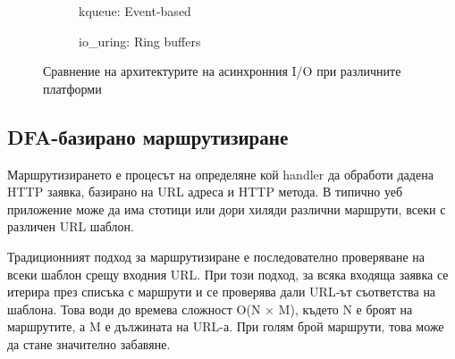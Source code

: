 \begin{figure}[H]
\begin{subfigure}[b]{0.32\textwidth}
\caption{kqueue: Event-based}
\label{fig:io-kqueue}
\end{subfigure}
\hfill
\begin{subfigure}[b]{0.32\textwidth}
\centering
{}
\caption{io\_uring: Ring buffers}
\label{fig:io-iouring}
\end{subfigure}
\caption{Сравнение на архитектурите на асинхронния I/O при различните платформи}
\label{fig:io-comparison}
\end{figure}

\subsection{DFA-базирано маршрутизиране}

Маршрутизирането е процесът на определяне кой handler да обработи дадена HTTP заявка, базирано на URL адреса и HTTP метода. В типично уеб приложение може да има стотици или дори хиляди различни маршрути, всеки с различен URL шаблон.

Традиционният подход за маршрутизиране е последователно проверяване на всеки шаблон срещу входния URL. При този подход, за всяка входяща заявка се итерира през списъка с маршрути и се проверява дали URL-ът съответства на шаблона. Това води до времева сложност O(N × M), където N е броят на маршрутите, а M е дължината на URL-а. При голям брой маршрути, това може да стане значително забавяне.

